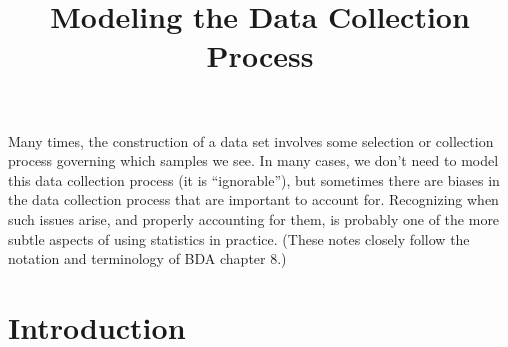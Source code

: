 \documentclass[12pt]{article}
\title{Modeling the Data Collection Process}
\author{}
\date{}
\begin{document}
\maketitle
\tableofcontents
\thispagestyle{firststyle}

\vspace{2em}

Many times, the construction of a data set involves some selection or collection process governing which samples we see. In many cases, we don't need to model this data collection process (it is ``ignorable''), but sometimes there are biases in the data collection process that are important to account for. Recognizing when such issues arise, and properly accounting for them, is probably one of the more subtle aspects of using statistics  in practice. (These notes closely follow the notation and terminology of BDA chapter 8.)

\newpage

\section{Introduction}
\end{document}
